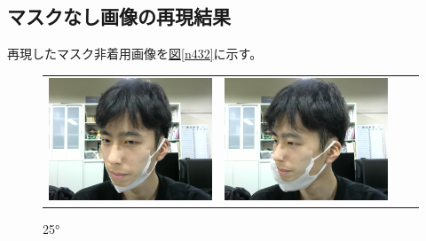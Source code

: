\documentclass[]{jarticle}          %
\begin{document}
\subsection{マスクなし画像の再現結果}
再現したマスク非着用画像を\hyperref[n431]{図\ref{n432}}に示す。
\begin{figure}[!ht]
  \begin{tabular}{cccc}
    \begin{minipage}[t]{0.25\hsize}
      \centering
      \includegraphics[keepaspectratio, scale=0.2]{figures/result/0mask/image_20231202-2.png}
      \caption{25°}
    \end{minipage} &
    \begin{minipage}[t]{0.25\hsize}
      \centering
      \includegraphics[keepaspectratio, scale=0.2]{figures/result/3mask/image_20231202-2.png}

\end{minipage}
\end{tabular}
\end{figure}
\end{document}
